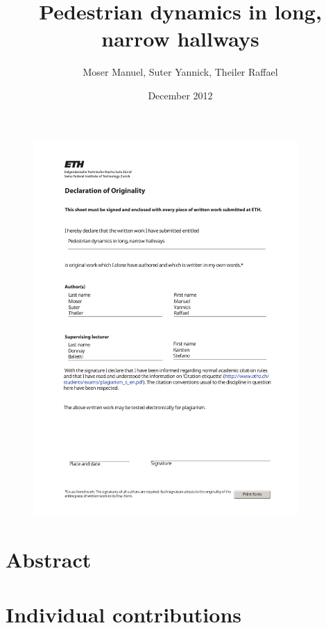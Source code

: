 \documentclass[11pt]{article}
\title{Pedestrian dynamics in long, narrow hallways}
\author{Moser Manuel, Suter Yannick, Theiler Raffael}
\date{December 2012}
\begin{document}

\newpage


\newpage


\begin{figure}
	\centering
	\includegraphics[width=0.9\textwidth]{declaration_print.pdf}
	\label{fig:declaration}
\end{figure}
\clearpage


\tableofcontents
\newpage


\section{Abstract}

\newpage

\section{Individual contributions}

\newpage
\end{document}

